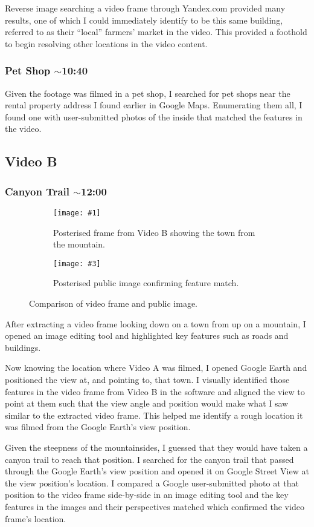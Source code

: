 \documentclass[a4paper,11pt]{report}
\newcommand{\comparison}[5] {
    \begin{figure}[htbp]
        \centering
        
        \begin{subfigure}[t]{0.45\textwidth}
            \centering
            \texttt{[image: \#1]}
            \caption{#2}
        \end{subfigure}
        \hfill
        \begin{subfigure}[t]{0.45\textwidth}
            \centering
            \texttt{[image: \#3]}
            \caption{#4}
        \end{subfigure}
    
        \caption{#5}
    \end{figure}
}
\begin{document}
Reverse image searching a video frame through Yandex.com provided many results, one of which I could immediately identify to be this same building, referred to as their “local” farmers’ market in the video. This provided a foothold to begin resolving other locations in the video content.

\subsubsection{Pet Shop $\sim$10:40}

Given the footage was filmed in a pet shop, I searched for pet shops near the rental property address I found earlier in Google Maps. Enumerating them all, I found one with user-submitted photos of the inside that matched the features in the video.

\subsection{Video B}

\subsubsection{Canyon Trail $\sim$12:00}

\comparison
    {images/canyon-video.png}
    {Posterised frame from Video B showing the town from the mountain.}
    {images/canyon-google.png}
    {Posterised public image confirming feature match.}
    {Comparison of video frame and public image.}

After extracting a video frame looking down on a town from up on a mountain, I opened an image editing tool and highlighted key features such as roads and buildings.

Now knowing the location where Video A was filmed, I opened Google Earth and positioned the view at, and pointing to, that town. I visually identified those features in the video frame from Video B in the software and aligned the view to point at them such that the view angle and position would make what I saw similar to the extracted video frame. This helped me identify a rough location it was filmed from the Google Earth's view position.

Given the steepness of the mountainsides, I guessed that they would have taken a canyon trail to reach that position. I searched for the canyon trail that passed through the Google Earth's view position and opened it on Google Street View at the view position's location. I compared a Google user-submitted photo at that position to the video frame side-by-side in an image editing tool and the key features in the images and their perspectives matched which confirmed the video frame's location.
\end{document}
